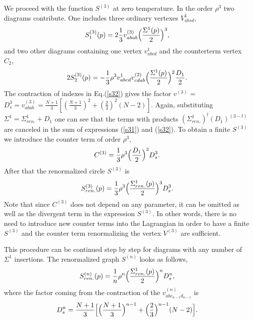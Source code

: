 \documentclass[a4paper,12pt]{article}
\begin{document}
We proceed with the function $S^{(3)}$ at zero temperature.  In the
order $\rho^3$ two diagrams contribute. One includes three ordinary
vertexes $ V^1_{absd}$,
\begin{equation} \label{s31}
S^{(3)}_1(p) = 2 \frac{1}{3}
v^{(3)}_{abab}\Bigl(\frac{\Sigma^1(p)}{2}\Bigr)^3,
\end{equation}
and two other diagrams containing one vertex $v^1_{abcd}$ and the
counterterm vertex $C_2$,
\begin{equation} \label{s32}
2 S^{(3)}_2(p) = - \frac{1}{3}\rho^3 v^1_{abcd}
v^{(2)}_{cdab}\Bigl(\frac{\Sigma^1(p)}{2}\Bigr)^2 \frac{D_1}{2}.
\end{equation}
The contraction of indexes in Eq.(\ref{s32}) gives the factor
$v^{(3)}$ = $D_s^3 = v^{(3)}_{abab} = \frac{N +
1}{3}[(\frac{N+1}{3})^2 + (\frac{2}{3})^2 (N-2)]$. Again, substituting
$\Sigma^1 = \Sigma^1_{ren.} + D_1$ one can see that the terms with
products $(\Sigma^1_{ren.})^l (D_1)^{(3-l)}$ are canceled in the sum
of expressions (\ref{s31}) and (\ref{s32}). To obtain a finite
$S^{(3)}$ we introduce the counter term of order $\rho^3$,
\begin{equation} \label{C3}
C^{(3)} = \frac{1}{3}\rho^3 \Bigl(\frac{D_1}{2}\Bigr)^3 D_s^3.
\end{equation}
After that the renormalized circle $S^{(3)}$ is
\begin{equation} \label{s3r}
S^{(3)}_{ren.}(p) = \frac{1}{3}\rho^3
\Bigl(\frac{\Sigma^1_{ren.}(p)}{2}\Bigr)^3 D_s^3.
\end{equation}
Note that since $C^{(3)}$ does not depend on any parameter, it can be
omitted as well as the divergent term in the expression $S^{(3)}$. In
other words, there is no need to introduce new counter terms into the
Lagrangian in order to have a finite $S^{(3)}$ and the counter term
renormalizing the vertex $V^{(3)}$ are sufficient.

This procedure can be continued step by step for diagrams with any
number of $\Sigma^1$ insertions. The renormalized graph $ S^{(n)}$
looks as follows,
\begin{equation} \label{snr}
S^{(n)}_{ren.}(p) = \frac{1}{n}\rho^n
\Bigl(\frac{\Sigma^1_{ren.}(p)}{2}\Bigr)^n D_s^n,
\end{equation}
where the factor coming from the contraction of the
$v^{(n)}_{abc_{n-1} d_{n-1}}$ is
\begin{equation} \label{dn}
D^{n}_{s} = \frac{N+1}{3}\Bigl[ \Bigl(\frac{N+1}{3}\Bigr)^{n-1} +
\Bigl(\frac{2}{3}\Bigr)^{n-1} (N -2)\Bigr].
\end{equation}
\end{document}

